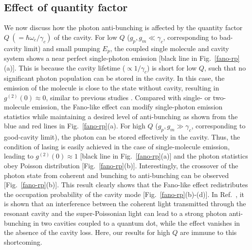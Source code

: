 \documentclass[aps,prb,
superscriptaddress,
,twocolumn
,floatfix,footinbib,longbibliography,
]{revtex4-2}
\begin{document}
\subsection{Effect of quantity factor}
We now discuss how the photon anti-bunching is affected by the quantity factor $Q~(=\hbar\omega_{c}/\gamma_{c})$ of the cavity.
For low $Q$ ($g_{p},g_{m}\ll \gamma_{c}$, corresponding to bad-cavity limit) and small pumping $E_{p}$, the coupled single molecule and cavity system shows a near perfect single-photon emission [black line in Fig.~\ref{fano-rp}(a)].
This is because the cavity lifetime ($\propto 1/\gamma_{c}$) is short for low $Q$, such that no significant photon population can be stored in the cavity.
In this case, the emission of the molecule is close to the state without cavity, resulting in $g^{(2)}(0)\approx0$, similar to previous studies \cite{PhysRevB.70.115304,PhysRevA.91.061804,zhang2017electrically,PhysRevLett.122.233901}.
Compared with single- or two-molecule emission, the Fano-like effect can modify single-photon emission statistics while maintaining
a desired level of anti-bunching as shown from the blue and red lines in Fig.~\ref{fano-rp}(a).
For high $Q$ ($g_{p},g_{m}\gg \gamma_{c}$, corresponding to good-cavity limit), the photon can be stored effectively in the cavity. Thus, the condition of lasing is easily achieved in the case of single-molecule emission, leading to $g^{(2)}(0)\approx 1$ [black line in Fig.~\ref{fano-rp}(a)] and the photon statistics obey Poisson distribution [Fig.~\ref{fano-rp}(b)].
Interestingly, the crossover of the photon state from coherent and bunching to anti-bunching can be observed [Fig.~\ref{fano-rp}(b)].
This result clearly shows that the Fano-like effect redistributes the occupation probability of the cavity mode [Fig.~\ref{fano-rp}(b)-(d)].
 In Ref.~\cite{PhysRevLett.108.183601}, it is shown that an interference between the coherent light transmitted through the resonant cavity and the super-Poissonian light can lead to a strong photon anti-bunching in two cavities coupled to a quantum dot, while the effect vanishes in the absence of the cavity loss. Here, our results for high $Q$ are immune to this shortcoming.
 
\end{document}
